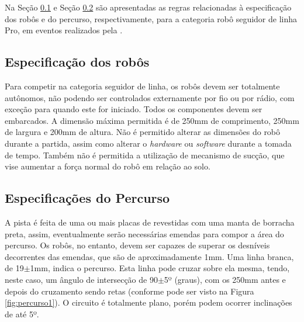 Na Seção \ref{cap:espc_robocore} e Seção \ref{cap:perc_robocore} são apresentadas as regras relacionadas à 
especificação dos robôs e do percurso, respectivamente, 
para a categoria robô seguidor de linha Pro, em eventos realizados pela .

\vspace{1cm}
\subsection{Especificação dos robôs} \label{cap:espc_robocore}

Para competir na categoria seguidor de linha, os robôs devem ser totalmente autônomos, não podendo ser controlados 
externamente por fio ou por rádio, com exceção para quando este for iniciado. Todos os componentes devem ser embarcados. A 
dimensão máxima permitida é de 250mm   de   comprimento,   250mm   de   largura   e   200mm   de   altura. Não é 
permitido alterar as dimensões do robô durante a partida, assim como alterar o \textit{hardware} ou \textit{software} 
durante a tomada de tempo. Também não é permitida a utilização de mecanismo de sucção, 
que vise aumentar a força normal do robô em relação ao solo.

\vspace{1cm}
\subsection{Especificações do Percurso} \label{cap:perc_robocore}

A pista é feita de uma ou mais placas de  revestidas com uma manta de 
borracha preta, assim, eventualmente serão necessárias emendas para compor a área do percurso. Os robôs, no entanto, 
devem ser capazes de superar os desníveis decorrentes das emendas, que são de aproximadamente 1mm.
Uma linha branca, de 19$\pm$1mm, indica o percurso. Esta linha pode cruzar sobre ela mesma, tendo, neste caso, 
um ângulo de intersecção de 90$\pm$5º (graus), com os 250mm antes e depois do cruzamento sendo retas (conforme pode 
ser visto na Figura \ref{fig:percurso1}). O circuito é totalmente plano, porém podem ocorrer 
inclinações de até 5º.\par



